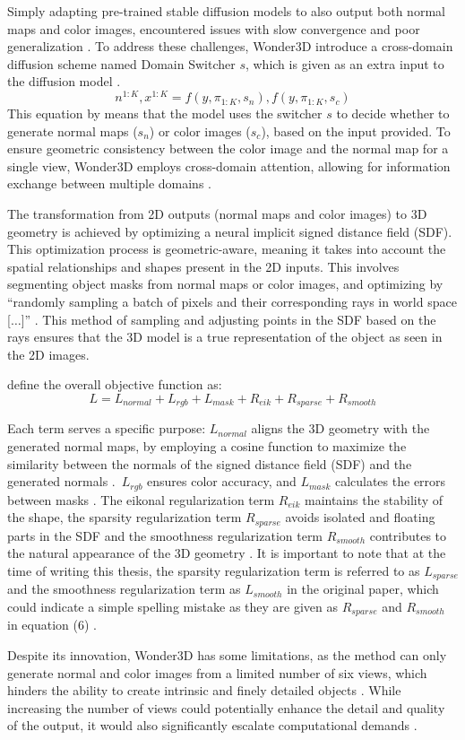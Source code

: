Simply adapting pre-trained stable diffusion models to also output both normal maps and color images, encountered issues with slow convergence and poor generalization \citep{long2023wonder3d}. To address these challenges, Wonder3D introduce a cross-domain diffusion scheme named Domain Switcher \(s\), which is given as an extra input to the diffusion model \citep{long2023wonder3d}. \[
  n^{1:K}, x^{1:K} = f(y, \pi_{1:K}, s_n), f(y, \pi_{1:K}, s_c)
\] This equation by \citeauthor{long2023wonder3d} means that the model uses the switcher \( s \) to decide whether to generate normal maps (\( s_n \)) or color images (\( s_c \)), based on the input provided. To ensure geometric consistency between the color image and the normal map for a single view, Wonder3D employs cross-domain attention, allowing for information exchange between multiple domains \citep{long2023wonder3d}.

The transformation from 2D outputs (normal maps and color images) to 3D geometry is achieved by optimizing a neural implicit signed distance field (SDF). This optimization process is geometric-aware, meaning it takes into account the spatial relationships and shapes present in the 2D inputs. This involves segmenting object masks from normal maps or color images, and optimizing by ``randomly sampling a batch of pixels and their corresponding rays in world space [\(\ldots\)]'' \citep{long2023wonder3d}. This method of sampling and adjusting points in the SDF based on the rays ensures that the 3D model is a true representation of the object as seen in the 2D images.

\citeauthor{long2023wonder3d} define the overall objective function as: \[ L = L_{normal} + L_{rgb} + L_{mask} + R_{eik} + R_{sparse} + R_{smooth} \]

Each term serves a specific purpose: \( L_{normal} \) aligns the 3D geometry with the generated normal maps, by employing a cosine function to maximize the similarity between the normals of the signed distance field (SDF) and the generated normals \citep{long2023wonder3d}.~\( L_{rgb} \) ensures color accuracy, and \( L_{mask} \) calculates the errors between masks \citep{long2023wonder3d}. The eikonal regularization term \( R_{eik} \) maintains the stability of the shape, the sparsity regularization term \( R_{sparse} \) avoids isolated and floating parts in the SDF and the smoothness regularization term \( R_{smooth} \) contributes to the natural appearance of the 3D geometry \citep{long2023wonder3d}. It is important to note that at the time of writing this thesis, the sparsity regularization term is referred to as \( L_{sparse} \) and the smoothness regularization term as \( L_{smooth} \) in the original paper, which could indicate a simple spelling mistake as they are given as \( R_{sparse} \) and \( R_{smooth} \) in equation (6) \citep{long2023wonder3d}.

Despite its innovation, Wonder3D has some limitations, as the method can only generate normal and color images from a limited number of six views, which hinders the ability to create intrinsic and finely detailed objects \citep{long2023wonder3d}.  While increasing the number of views could potentially enhance the detail and quality of the output, it would also significantly escalate computational demands \citep{long2023wonder3d}.